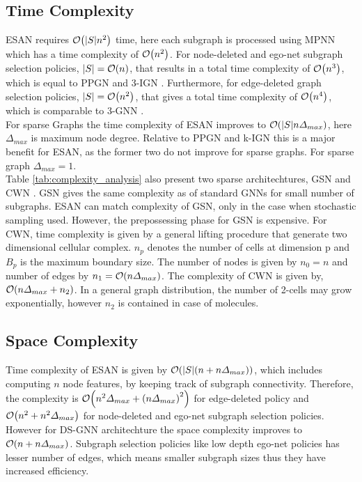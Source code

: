 \documentclass[11pt, dvipsnames, DIV=12]{scrreprt}
\let\originalleft\left
\let\originalright\right
\renewcommand{\left}{\mathopen{}\mathclose\bgroup\originalleft}
\renewcommand{\right}{\aftergroup\egroup\originalright}
\theoremstyle{definition}
\begin{document}
\subsection{Time Complexity}ESAN requires $\mathcal{O}\left(|S|n^2\right)$ time, here each subgraph is processed using MPNN which has a time complexity of $\mathcal{O}\left(n^2\right)$. For node-deleted and ego-net subgraph selection policies, $|S|=\mathcal{O}\left(n\right)$, that results in a total time complexity of $\mathcal{O}\left(n^3\right)$, which is equal to PPGN \citep{haggai_provab_powerfulgnn_2019a} and 3-IGN \citep{haggai_inv_equiv_2019b}. Furthermore, for edge-deleted graph selection policies, $|S|=\mathcal{O}\left(n^2\right)$, that gives a total time complexity of $\mathcal{O}\left(n^4\right)$, which is comparable to 3-GNN \citep{christopher_higher_order_gnn_2019}.\\
For sparse Graphs the time complexity of ESAN improves to $\mathcal{O}\left(|S|n\Delta_{max}\right)$, here $\Delta_{max}$ is maximum node degree. Relative to PPGN and k-IGN this is a major benefit for ESAN, as the former two do not improve for sparse graphs. For sparse graph $\Delta_{max}=1$.\\
Table \ref{tab:complexity_analysis} also present two sparse architechtures, GSN \citep{bouritsas_improv_gnn_2022} and CWN \citep{bodnar_weisfeiler_cw_2021a}. GSN gives the same complexity as of standard GNNs for small number of subgraphs. ESAN can match complexity of GSN, only in the case when stochastic sampling used. However, the prepossessing phase for GSN is expensive. For CWN, time complexity is given by a general lifting procedure that generate two dimensional cellular complex. $n_p$ denotes the number of cells at dimension p and $B_p$ is the maximum boundary size. The number of nodes is given by $n_0 = n$ and number of edges by $n_1=\mathcal{O}\left(n\Delta_{max}\right)$. The complexity of CWN is given by, $\mathcal{O}\left(n\Delta_{max}+n_2\right)$.  In a general graph distribution, the number of 2-cells may grow exponentially, however $n_2$ is contained in case of molecules.
\subsection{Space Complexity} Time complexity of ESAN is given by $\mathcal{O}\left(|S|\left(n+n\Delta_{max}\right)\right)$, which includes computing $n$ node features, by keeping track of subgraph connectivity. Therefore, the complexity is $\mathcal{O}\left(n^2\Delta_{max}+\left(n\Delta_{max}\right)^2\right)$ for edge-deleted policy and $\mathcal{O}\left(n^2+n^2\Delta_{max}\right)$ for node-deleted and ego-net subgraph selection policies. However for DS-GNN architechture the space complexity improves to $\mathcal{O}\left(n+n\Delta_{max}\right)$. Subgraph selection policies like low depth ego-net policies has lesser number of edges, which means smaller subgraph sizes thus they have increased efficiency.
\end{document}
